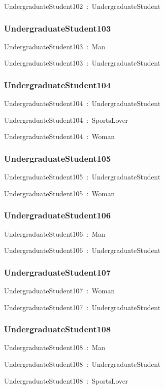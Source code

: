 \documentclass{article}
\begin{document}
UndergraduateStudent102~:~UndergraduateStudent

\subsubsection*{UndergraduateStudent103}

UndergraduateStudent103~:~Man

UndergraduateStudent103~:~UndergraduateStudent

\subsubsection*{UndergraduateStudent104}

UndergraduateStudent104~:~UndergraduateStudent

UndergraduateStudent104~:~SportsLover

UndergraduateStudent104~:~Woman

\subsubsection*{UndergraduateStudent105}

UndergraduateStudent105~:~UndergraduateStudent

UndergraduateStudent105~:~Woman

\subsubsection*{UndergraduateStudent106}

UndergraduateStudent106~:~Man

UndergraduateStudent106~:~UndergraduateStudent

\subsubsection*{UndergraduateStudent107}

UndergraduateStudent107~:~Woman

UndergraduateStudent107~:~UndergraduateStudent

\subsubsection*{UndergraduateStudent108}

UndergraduateStudent108~:~Man

UndergraduateStudent108~:~UndergraduateStudent

UndergraduateStudent108~:~SportsLover
\end{document}
